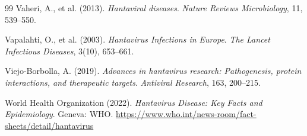 ﻿\documentclass[a4paper,12pt]{article}
\theoremstyle{definition}
\begin{document}
\begin{thebibliography}{99}
    Vaheri, A., et al. (2013).
    \emph{Hantaviral diseases}.
    \textit{Nature Reviews Microbiology}, 11, 539--550.

    Vapalahti, O., et al. (2003).
    \emph{Hantavirus Infections in Europe}.
    \textit{The Lancet Infectious Diseases}, 3(10), 653--661.

    Viejo-Borbolla, A. (2019).
    \emph{Advances in hantavirus research: Pathogenesis, protein interactions,
    and therapeutic targets}.
    \textit{Antiviral Research}, 163, 200--215.

    World Health Organization (2022).
    \emph{Hantavirus Disease: Key Facts and Epidemiology}.
    Geneva: WHO. \url{https://www.who.int/news-room/fact-sheets/detail/hantavirus}
\end{thebibliography}
\end{document}
